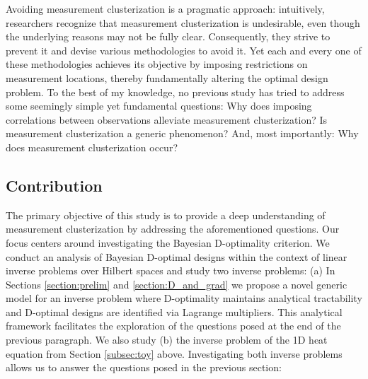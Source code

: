 \documentclass[ba]{imsart}
\theoremstyle{plain}
\theoremstyle{definition}
\theoremstyle{remark}
\begin{document}
Avoiding measurement clusterization is a pragmatic approach:
intuitively, researchers recognize that measurement clusterization is
undesirable, even though the underlying reasons may not be fully
clear. Consequently, they strive to prevent it and devise various
methodologies to avoid it. Yet each and every one of these
methodologies achieves its objective by imposing restrictions on
measurement locations, thereby fundamentally altering the optimal
design problem. To the best of my knowledge, no previous study has
tried to address some seemingly simple yet fundamental questions:
Why does imposing correlations between observations alleviate
measurement clusterization?
Is measurement clusterization a generic phenomenon? 
And, most importantly: Why does measurement clusterization occur?



\subsection{Contribution}
The primary objective of this study is to provide a deep understanding
of measurement clusterization by addressing the aforementioned
questions. Our focus centers around investigating the Bayesian
D-optimality criterion. We conduct an analysis of Bayesian D-optimal
designs within the context of linear inverse problems over Hilbert
spaces and study two inverse problems: (a) In Sections
\ref{section:prelim} and \ref{section:D_and_grad} we propose a novel
generic model for an inverse problem where D-optimality maintains
analytical tractability and D-optimal designs are identified via
Lagrange multipliers. This analytical framework facilitates the
exploration of the questions posed at the end of the previous
paragraph. We also study (b) the inverse problem of the 1D heat
equation from Section \ref{subsec:toy} above. Investigating both
inverse problems allows us to answer the questions posed in the
previous section:
\end{document}

